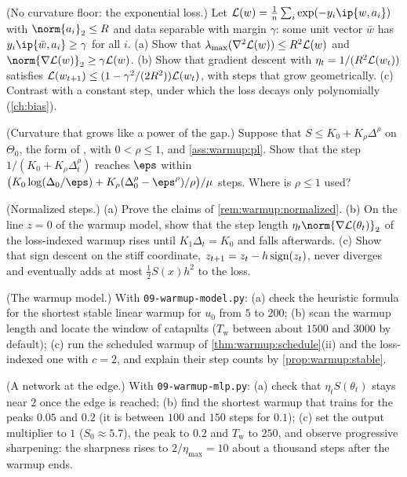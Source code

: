 \begin{refsection}
\begin{exercises}
\item \variation (No curvature floor: the exponential loss.) Let $\Loss(w)=\frac1n\sum_i\exp(-y_i\ip{w,a_i})$ with $\norm{a_i}_2\le R$ and data separable with margin $\gamma$: some unit vector $\bar w$ has $y_i\ip{\bar w,a_i}\ge\gamma$ for all $i$. (a) Show that $\lambda_{\max}(\nabla^2\mathcal{L}(w))\le R^2\mathcal{L}(w)$ and $\norm{\nabla\Loss(w)}_2\ge\gamma\Loss(w)$. (b) Show that gradient descent with $\eta_t=1/(R^2\mathcal{L}(w_t))$ satisfies $\mathcal{L}(w_{t+1})\le(1-\gamma^2/(2R^2))\mathcal{L}(w_t)$, with steps that grow geometrically. (c) Contrast with a constant step, under which the loss decays only polynomially (\cref{ch:bias}).\label{ex:warmup:exponential}

\item \variation (Curvature that grows like a power of the gap.) Suppose that $S\le K_0+K_\rho\Delta^\rho$ on $\Theta_0$, the form of \textcite{LiuEtAl2025Warmup}, with $0<\rho\le1$, and \cref{ass:warmup:pl}. Show that the step $1/(K_0+K_\rho\Delta_t^\rho)$ reaches $\eps$ within $\bigl(K_0\log(\Delta_0/\eps)+K_\rho(\Delta_0^\rho-\eps^\rho)/\rho\bigr)/\mu$ steps. Where is $\rho\le1$ used?\label{ex:warmup:power}

\item \variation (Normalized steps.) (a) Prove the claims of \cref{rem:warmup:normalized}.  (b) On the line $z=0$ of the warmup model, show that the step length $\eta_t\norm{\nabla\Loss(\theta_t)}_2$ of the loss-indexed warmup rises until $K_1\Delta_t=K_0$ and falls afterwards. (c) Show that sign descent on the stiff coordinate, $z_{t+1}=z_t-h\operatorname{sign}(z_t)$, never diverges and eventually adds at most $\frac12S(x)h^2$ to the loss.\label{ex:warmup:normalized}

\item \simulation (The warmup model.) With \texttt{09-warmup-model.py}: (a) check the heuristic formula for the shortest stable linear warmup for $u_0$ from $5$ to $200$; (b) scan the warmup length and locate the window of catapults ($T_{\mathrm w}$ between about $1500$ and $3000$ by default); (c) run the scheduled warmup of \cref{thm:warmup:schedule}(ii) and the loss-indexed one with $c=2$, and explain their step counts by \cref{prop:warmup:stable}.\label{ex:warmup:simmodel}

\item \simulation (A network at the edge.) With \texttt{09-warmup-mlp.py}: (a) check that $\eta_tS(\theta_t)$ stays near $2$ once the edge is reached; (b) find the shortest warmup that trains for the peaks $0.05$ and $0.2$ (it is between $100$ and $150$ steps for $0.1$); (c) set the output multiplier to $1$ ($S_0\approx5.7$), the peak to $0.2$ and $T_{\mathrm w}$ to $250$, and observe progressive sharpening: the sharpness rises to $2/\eta_{\max}=10$ about a thousand steps after the warmup ends.\label{ex:warmup:simmlp}


\end{exercises}
\end{refsection}
